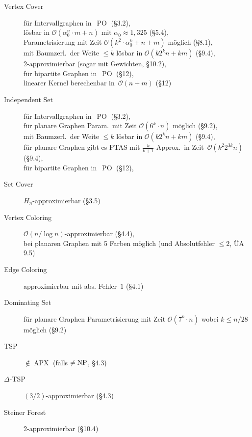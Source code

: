 \documentclass{cheat-sheet}
\DeclareMathOperator{\PO}{PO} %
\DeclareMathOperator{\APX}{APX} %
\DeclareMathOperator{\NP}{NP} %
\let\P\relax %
\DeclareMathOperator{\P}{P} %
\renewcommand{\O}{\mathcal{O}} %
\begin{document}
\begin{description}
  \item[Vertex Cover]
    für Intervallgraphen in~$\PO$ (§3.2), \\
    lösbar in $\O(\alpha_0^n \cdot m + n)$ mit $\alpha_0 \approx 1,325$ (§5.4), \\
    Parametrisierung mit Zeit $\O(k^2 \cdot \alpha_0^k + n + m)$ möglich (§8.1), \\
    mit Baumzerl.\ der Weite $\leq k$ lösbar in $\O(k 2^k n + k m)$ (§9.4), \\
    2-approximierbar (sogar mit Gewichten, §10.2), \\
    für bipartite Graphen in~$\PO$ (§12), \\
    linearer Kernel berechenbar in~$\O(n+m)$ (§12)

  \item[Independent Set]
    für Intervallgraphen in~$\PO$ (§3.2), \\
    für planare Graphen Param.\ mit Zeit $\O(6^k \cdot n)$ möglich (§9.2), \\
    mit Baumzerl.\ der Weite $\leq k$ lösbar in $\O(k 2^k n + k m)$ (§9.4), \\
    für planare Graphen gibt es PTAS mit $\tfrac{k}{k+1}$-Approx.\ in Zeit~$\O(k^2 2^{3 k} n)$ (§9.4), \\
    für bipartite Graphen in~$\PO$ (§12),

  \item[Set Cover]
    $H_n$-approximierbar (§3.5)

  \item[Vertex Coloring]
    $\O(n / \log n)$-approximierbar (§4.4), \\
    bei planaren Graphen mit 5 Farben möglich (und Absolutfehler $\leq 2$, ÜA 9.5)

  \item[Edge Coloring]
    approximierbar mit abs. Fehler~$1$ (§4.1)

  \item[Dominating Set]
    für planare Graphen Parametrisierung mit Zeit $\O(7^k \cdot n)$ wobei $k \leq n/28$ möglich (§9.2)

  \item[TSP]
    $\not\in \APX$ (falls $\P \neq \NP$, §4.3)

  \item[$\Delta$-TSP]
    $(3/2)$-approximierbar (§4.3)

  \item[Steiner Forest]
    2-approximierbar (§10.4)


\end{description}
\end{document}
